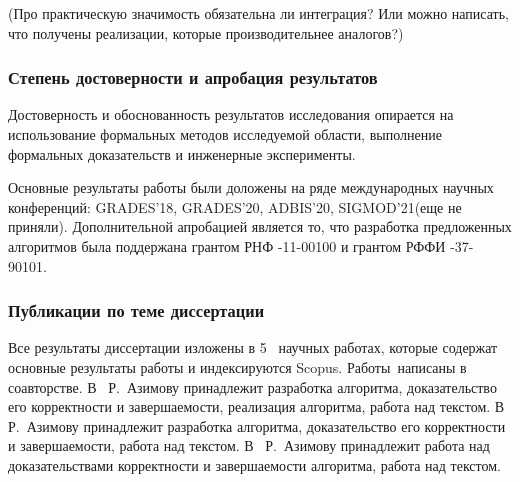 (Про практическую значимость обязательна ли интеграция? Или можно написать, что получены реализации, которые производительнее аналогов?)






\subsubsection*{\large{Степень достоверности и апробация результатов}}
Достоверность и обоснованность результатов исследования опирается на использование формальных методов исследуемой области, выполнение формальных доказательств и инженерные эксперименты.

Основные результаты работы были доложены на ряде международных научных конференций: GRADES'18, GRADES'20, ADBIS’20, SIGMOD'21(еще не приняли). Дополнительной апробацией является то, что разработка предложенных алгоритмов была поддержана грантом РНФ -11-00100 и грантом РФФИ -37-90101.

\subsubsection*{\large{Публикации по теме диссертации}}
 Все результаты диссертации изложены в 5~\cite{1,2,3,4,5} научных работах, которые содержат основные результаты работы и индексируются Scopus. Работы~\cite{1,2,3,4}написаны в соавторстве. В~\cite{1} Р.~Азимову принадлежит разработка алгоритма, доказательство его корректности и завершаемости, реализация алгоритма, работа над текстом. В~\cite{2} Р.~Азимову принадлежит разработка алгоритма, доказательство его корректности и завершаемости, работа над текстом. В~\cite{3,4} Р.~Азимову принадлежит работа над доказательствами корректности и завершаемости алгоритма, работа над текстом.
 
